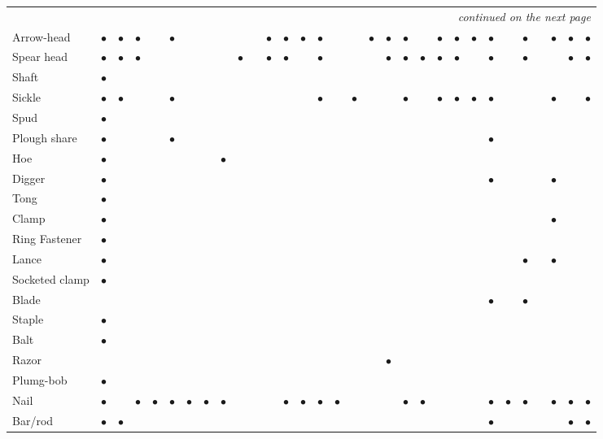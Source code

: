 {{{\begin{longtable}{|l|c|c|c|c|c|c|c|c|c|c|c|c|c|c|c|c|c|c|c|c|c|c|c|c|c|c|c|c|c|c|}
\hline
\endhead
\hline
\multicolumn{31}{r}{\small\itshape continued on the next page}\\
\endfoot
\endlastfoot
\hline
Arrow-head &$\bullet$&$\bullet$&$\bullet$&&$\bullet$&&&&&&$\bullet$&$\bullet$&$\bullet$&$\bullet$&&&$\bullet$&$\bullet$&$\bullet$&&$\bullet$&$\bullet$&$\bullet$&$\bullet$&&$\bullet$&&$\bullet$&$\bullet$&$\bullet$\\
Spear head &$\bullet$&$\bullet$&$\bullet$&&&&&&$\bullet$&&$\bullet$&$\bullet$&&$\bullet$&&&&$\bullet$&$\bullet$&$\bullet$&$\bullet$&$\bullet$&&$\bullet$&&$\bullet$&&&$\bullet$&$\bullet$ \\
Shaft &$\bullet$&&&&&&&&&&&&&&&&&&&&&&&&&&&&&\\
Sickle &$\bullet$&$\bullet$&&&$\bullet$&&&&&&&&&$\bullet$&&$\bullet$&&&$\bullet$&&$\bullet$&$\bullet$&$\bullet$&$\bullet$&&&&$\bullet$&&$\bullet$\\
Spud &$\bullet$&&&&&&&&&&&&&&&&&&&&&&&&&&&&&\\
Plough share &$\bullet$&&&&$\bullet$&&&&&&&&&&&&&&&&&&&$\bullet$&&&&&&\\
Hoe &$\bullet$&&&&&&&$\bullet$&&&&&&&&&&&&&&&&&&&&&&\\
Digger &$\bullet$&&&&&&&&&&&&&&&&&&&&&&&$\bullet$&&&&$\bullet$&&\\
Tong &$\bullet$&&&&&&&&&&&&&&&&&&&&&&&&&&&&&\\
Clamp &$\bullet$&&&&&&&&&&&&&&&&&&&&&&&&&&&$\bullet$&&\\
Ring Fastener &$\bullet$&&&&&&&&&&&&&&&&&&&&&&&&&&&&&\\
Lance &$\bullet$&&&&&&&&&&&&&&&&&&&&&&&&&$\bullet$&&$\bullet$&&\\
Socketed clamp &$\bullet$&&&&&&&&&&&&&&&&&&&&&&&&&&&&&\\
Blade &&&&&&&&&&&&&&&&&&&&&&&&$\bullet$&&$\bullet$&&&&\\
Staple &$\bullet$&&&&&&&&&&&&&&&&&&&&&&&&&&&&&\\
Balt &$\bullet$&&&&&&&&&&&&&&&&&&&&&&&&&&&&&\\
Razor &&&&&&&&&&&&&&&&&&$\bullet$&&&&&&&&&&&&\\
Plumg-bob &$\bullet$&&&&&&&&&&&&&&&&&&&&&&&&&&&&&\\
Nail &$\bullet$&&$\bullet$&$\bullet$&$\bullet$&$\bullet$&$\bullet$&$\bullet$&&&&$\bullet$&$\bullet$&$\bullet$&$\bullet$&&&&$\bullet$&$\bullet$&&&&$\bullet$&$\bullet$&$\bullet$&&$\bullet$&$\bullet$&$\bullet$\\
Bar/rod &$\bullet$&$\bullet$&&&&&&&&&&&&&&&&&&&&&&$\bullet$&&&&&$\bullet$&$\bullet$\\

\end{longtable}}}}
